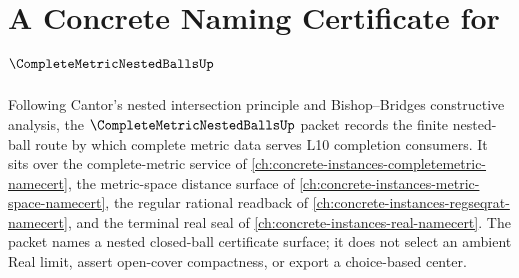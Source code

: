\chapter{A Concrete Naming Certificate for $\CompleteMetricNestedBallsUp$}
\label{ch:concrete-instances-complete-metric-nested-balls-namecert}

Following Cantor's nested intersection principle and Bishop--Bridges constructive analysis, the $\CompleteMetricNestedBallsUp$ packet records the finite nested-ball route by which complete metric data serves L10 completion consumers. It sits over the complete-metric service of \autoref{ch:concrete-instances-completemetric-namecert}, the metric-space distance surface of \autoref{ch:concrete-instances-metric-space-namecert}, the regular rational readback of \autoref{ch:concrete-instances-regseqrat-namecert}, and the terminal real seal of \autoref{ch:concrete-instances-real-namecert}. The packet names a nested closed-ball certificate surface; it does not select an ambient Real limit, assert open-cover compactness, or export a choice-based center.

